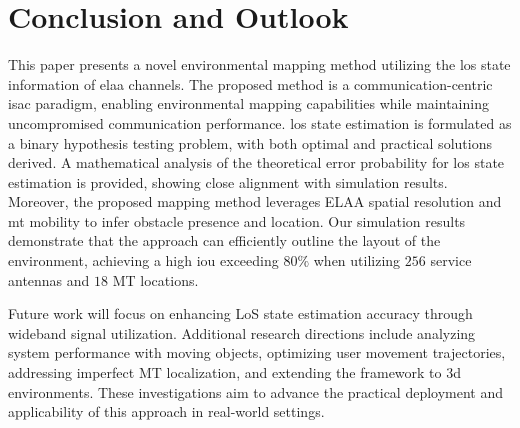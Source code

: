 \documentclass[conference, a4paper]{IEEEtran}
\begin{document}
\section{Conclusion and Outlook}
This paper presents a novel environmental mapping method utilizing the \gls{los} state information of \gls{elaa} channels.
The proposed method is a communication-centric \gls{isac} paradigm, enabling environmental mapping capabilities while maintaining uncompromised communication performance.
\gls{los} state estimation is formulated as a binary hypothesis testing problem, with both optimal and practical solutions derived.
A mathematical analysis of the theoretical error probability for \gls{los} state estimation is provided, showing close alignment with simulation results.
Moreover, the proposed mapping method leverages ELAA spatial resolution and \gls{mt} mobility to infer obstacle presence and location.
Our simulation results demonstrate that the approach can efficiently outline the layout of the environment, achieving a high \gls{iou} exceeding $80\%$ when utilizing $256$ service antennas and $18$ MT locations.

Future work will focus on enhancing LoS state estimation accuracy through wideband signal utilization.
Additional research directions include analyzing system performance with moving objects, optimizing user movement trajectories, addressing imperfect MT localization, and extending the framework to \gls{3d} environments.
These investigations aim to advance the practical deployment and applicability of this approach in real-world settings.

\appendices
\end{document}
